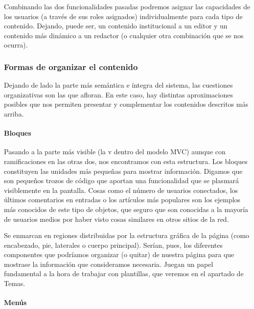 \par Combinando las dos funcionalidades pasadas podremos asignar las capacidades de los usuarios (a través de sus roles asignados) individualmente para cada tipo de contenido. Dejando, puede ser, un contenido institucional a un editor y un contenido más dinámico a un redactor (o cualquier otra combinación que se nos ocurra).

\subsubsection{Formas de organizar el contenido}

\par Dejando de lado la parte más semántica e íntegra del sistema, las cuestiones organizativas son las que afloran. En este caso, hay distintas aproximaciones posibles que nos permiten presentar y complementar los contenidos descritos más arriba.

\paragraph{Bloques}

\par Pasando a la parte más visible (la v dentro del modelo MVC) aunque con ramificaciones en las otras dos, nos encontramos con esta estructura. Los bloques constituyen las unidades más pequeñas para mostrar información. Digamos que son pequeños trozos de código que aportan una funcionalidad que se plasmará visiblemente en la pantalla. Cosas como el número de usuarios conectados, los últimos comentarios en entradas o los artículos más populares son los ejemplos más conocidos de este tipo de objetos, que seguro que son conocidas a la mayoría de usuarios medios por haber visto cosas similares en otros sitios de la red.

\par Se enmarcan en regiones distribuidas por la estructura gráfica de la página (como encabezado, pie, laterales o cuerpo principal). Serían, pues, los diferentes componentes que podríamos organizar (o quitar) de nuestra página para que mostrase la información que consideramos necesaria. Juegan un papel fundamental a la hora de trabajar con plantillas, que veremos en el apartado de Temas.


\paragraph{Menús}

